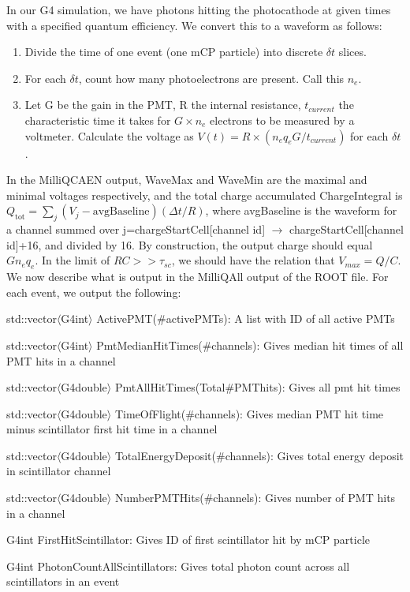 \documentclass[prd,noshowpacs,nofootinbib,amsmath,amssymb,superscriptaddress]{revtex4}
\begin{document}
In our G4 simulation, we have photons hitting the photocathode at given times with a specified quantum efficiency. We convert this to a waveform as follows: 
%
\begin{enumerate}
\item Divide the time of one event (one mCP particle) into discrete $\delta t$ slices. 
\item For each $\delta t$, count how many photoelectrons are present. Call this $n_e$. 
\item Let G be the gain in the PMT, R the internal resistance, $t_{current}$ the characteristic time it takes for $G\times n_e$ electrons to be measured by a voltmeter. Calculate the voltage as $V(t)=R\times (n_e q_e G/t_{current})$ for each $\delta t$. 
\end{enumerate}
%
In the MilliQCAEN output, WaveMax and WaveMin are the maximal and minimal voltages respectively, and the total charge accumulated ChargeIntegral is $Q_{\text{tot}}=\sum_j (V_j-\text{avgBaseline}) (\Delta t/R)$, where avgBaseline is the waveform for a channel summed over j=chargeStartCell[channel id] $\rightarrow$ chargeStartCell[channel id]+16, and divided by 16. By construction, the output charge should equal $G n_e q_e$. In the limit of $RC>>\tau_{sc}$, we should have the relation that $V_{max}=Q/C$. \\
We now describe what is output in the MilliQAll output of the ROOT file. For each event, we output the following:
%
\bi
\item std::vector$\langle$G4int$\rangle$ ActivePMT(\#activePMTs):  A list with ID of all active PMTs 
\item std::vector$\langle$G4int$\rangle$ PmtMedianHitTimes(\#channels): Gives median hit times of all PMT hits in a channel
\item std::vector$\langle$G4double$\rangle$ PmtAllHitTimes(Total\#PMThits): Gives all pmt hit times
\item std::vector$\langle$G4double$\rangle$ TimeOfFlight(\#channels): Gives median PMT hit time minus scintillator first hit time in a channel
\item std::vector$\langle$G4double$\rangle$ TotalEnergyDeposit(\#channels): Gives total energy deposit in scintillator channel 
\item std::vector$\langle$G4double$\rangle$ NumberPMTHits(\#channels): Gives number of PMT hits in a channel  
\item G4int FirstHitScintillator: Gives ID of first scintillator hit by mCP particle 
\item G4int PhotonCountAllScintillators: Gives total photon count across all scintillators in an event
\ei
\end{document}

